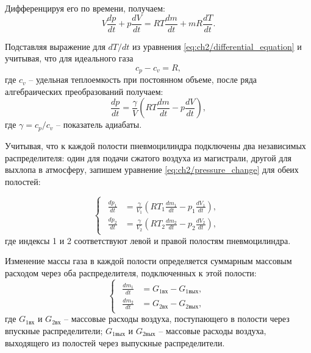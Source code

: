 Дифференцируя его по времени, получаем:
\begin{equation}
\label{eq:ch2/ideal_gas_differential}
    V\frac{dp}{dt} + p\frac{dV}{dt} = RT\frac{dm}{dt} + mR\frac{dT}{dt}.
\end{equation}

Подставляя выражение для $dT/dt$ из уравнения \eqref{eq:ch2/differential_equation} и учитывая, что для идеального газа
\begin{equation}
\label{eq:ch2/specific_heat_difference}
    c_p - c_v = R,
\end{equation}
где $c_v$ -- удельная теплоемкость при постоянном объеме, после ряда алгебраических преобразований получаем:
\begin{equation}
\label{eq:ch2/pressure_change}
    \frac{dp}{dt} = \frac{\gamma}{V}\left(RT\frac{dm}{dt} - p\frac{dV}{dt}\right),
\end{equation}
где $\gamma = c_p/c_v$ -- показатель адиабаты.

Учитывая, что к каждой полости пневмоцилиндра подключены два независимых распределителя:
один для подачи сжатого воздуха из магистрали, другой для выхлопа в атмосферу,
запишем уравнение \eqref{eq:ch2/pressure_change} для обеих полостей:

\begin{equation}
\label{eq:ch2/pressure_system}
    \begin{cases}
        \begin{aligned}
            \frac{dp_1}{dt} & = \frac{\gamma}{V_1}\left(RT_1\frac{dm_1}{dt} - p_1\frac{dV_1}{dt}\right), \\
            \frac{dp_2}{dt} & = \frac{\gamma}{V_2}\left(RT_2\frac{dm_2}{dt} - p_2\frac{dV_2}{dt}\right),
        \end{aligned}
    \end{cases}
\end{equation}
где индексы 1 и 2 соответствуют левой и правой полостям пневмоцилиндра.

Изменение массы газа в каждой полости определяется суммарным массовым
расходом через оба распределителя, подключенных к этой полости:
\begin{equation}
\label{eq:ch2/mass_change}
    \begin{cases}
        \begin{aligned}
            \frac{dm_1}{dt} & = G_{1\text{вх}} - G_{1\text{вых}}, \\
            \frac{dm_2}{dt} & = G_{2\text{вх}} - G_{2\text{вых}},
        \end{aligned}
    \end{cases}
\end{equation}
где $G_{1\text{вх}}$ и $G_{2\text{вх}}$ -- массовые расходы воздуха, поступающего в полости через впускные распределители;
$G_{1\text{вых}}$ и $G_{2\text{вых}}$ -- массовые расходы воздуха, выходящего из полостей через выпускные распределители.

